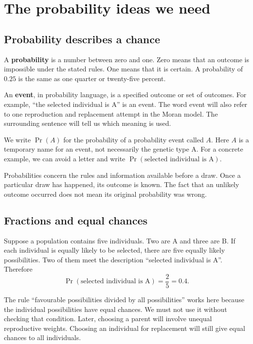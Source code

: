 \chapter{The probability ideas we need}
\label{chap:probability}

\section{Probability describes a chance}

A \textbf{probability} is a number between zero and one. Zero means that an
outcome is impossible under the stated rules. One means that it is certain.
A probability of \(0.25\) is the same as one quarter or twenty-five percent.

An \textbf{event}, in probability language, is a specified outcome or set of
outcomes. For example, ``the selected individual is A'' is an event. The
word event will also refer to one reproduction and replacement attempt in
the Moran model. The surrounding sentence will tell us which meaning is used.

We write \(\Pr(A)\) for the probability of a probability event called
\(A\). Here \(A\) is a temporary name for an event, not necessarily the
genetic type A. For a concrete example, we can avoid a letter and write
\(\Pr(\text{selected individual is A})\).

Probabilities concern the rules and information available before a draw.
Once a particular draw has happened, its outcome is known. The fact that an
unlikely outcome occurred does not mean its original probability was wrong.

\section{Fractions and equal chances}

Suppose a population contains five individuals. Two are A and three are B.
If each individual is equally likely to be selected, there are five equally
likely possibilities. Two of them meet the description ``selected individual
is A''. Therefore
\[
  \Pr(\text{selected individual is A})=\frac{2}{5}=0.4.
\]

The rule ``favourable possibilities divided by all possibilities'' works here
because the individual possibilities have equal chances. We must not use it
without checking that condition. Later, choosing a parent will involve
unequal reproductive weights. Choosing an individual for replacement will
still give equal chances to all individuals.

